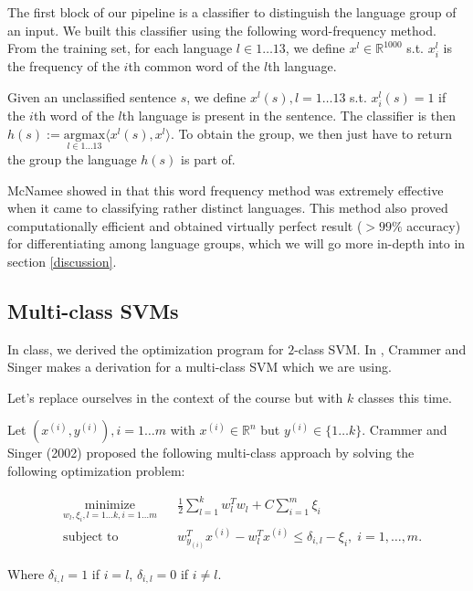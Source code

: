 \documentclass{article}
\begin{document}
The first block of our pipeline is a classifier to distinguish the language group of an input. We built this classifier using the following word-frequency method. From the training set, for each language $l \in 1\ldots 13$, we define $x^l \in \mathbb{R}^{1000}$ s.t. $x_i^l$ is the frequency of the $i$th common word of the $l$th language.

Given an unclassified sentence $s$, we define $x^l(s), l=1\ldots 13$ s.t. $x_i^l(s) = 1$ if the $i$th word of the $l$th language is present in the sentence. The classifier is then $h(s) := \underset{l\in 1 \ldots 13}{\mathrm{argmax}} \langle x^l(s), x^l \rangle$. To obtain the group, we then just have to return the group the language $h(s)$ is part of.

McNamee showed in \cite{MacNee} that this word frequency method was extremely effective when it came to classifying rather distinct languages. This method also proved computationally efficient and obtained virtually perfect result ($>99\%$ accuracy) for differentiating among language groups, which we will go more in-depth into in section \ref{discussion}.

\subsection{Multi-class SVMs}

In class, we derived the optimization program for $2$-class SVM. In \cite{multiclass}, Crammer and Singer makes a derivation for a multi-class SVM which we are using.

Let's replace ourselves in the context of the course but with $k$ classes this time. 

Let $(x^{(i)}, y^{(i)}), i=1\ldots m$ with $x^{(i)} \in \mathbb{R}^n$ but $y^{(i)} \in \{1 \ldots k\}$. Crammer and Singer (2002) proposed the following multi-class approach by solving the following optimization problem:

\begin{equation*}
\begin{aligned}
& \underset{w_l, \xi_i, l=1\ldots k, i = 1\ldots m}{\text{minimize}}
& & \frac{1}{2} \sum\limits_{l=1}^k w_l^Tw_l + C \sum\limits_{i=1}^m \xi_i\\
& \text{subject to}
& & w_{y_{(i)}}^Tx^{(i)} - w_l^Tx^{(i)} \leq \delta_{i,l} - \xi_i, \; i = 1, \ldots, m.
\end{aligned}
\end{equation*}

Where $\delta_{i,l} = 1$ if $i=l$, $\delta_{i,l} = 0$ if $i \neq l$.
\end{document}
